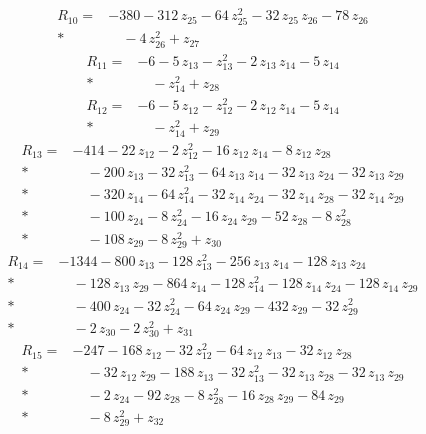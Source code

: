 \documentclass[10pt]{article}
\begin{document}
\begin{align*}
R_{10}={}& - 380 - 312\,z_{25} - 64\,z_{25}^{2} - 32\,z_{25}\,z_{26} - 78\,z_{26} \\*
&\quad - 4\,z_{26}^{2} + z_{27}
\end{align*}
\begin{align*}
R_{11}={}& - 6 - 5\,z_{13} - z_{13}^{2} - 2\,z_{13}\,z_{14} - 5\,z_{14} \\*
&\quad - z_{14}^{2} + z_{28}
\end{align*}
\begin{align*}
R_{12}={}& - 6 - 5\,z_{12} - z_{12}^{2} - 2\,z_{12}\,z_{14} - 5\,z_{14} \\*
&\quad - z_{14}^{2} + z_{29}
\end{align*}
\begin{align*}
R_{13}={}& - 414 - 22\,z_{12} - 2\,z_{12}^{2} - 16\,z_{12}\,z_{14} - 8\,z_{12}\,z_{28} \\*
&\quad - 200\,z_{13} - 32\,z_{13}^{2} - 64\,z_{13}\,z_{14} - 32\,z_{13}\,z_{24} - 32\,z_{13}\,z_{29} \\*
&\quad - 320\,z_{14} - 64\,z_{14}^{2} - 32\,z_{14}\,z_{24} - 32\,z_{14}\,z_{28} - 32\,z_{14}\,z_{29} \\*
&\quad - 100\,z_{24} - 8\,z_{24}^{2} - 16\,z_{24}\,z_{29} - 52\,z_{28} - 8\,z_{28}^{2} \\*
&\quad - 108\,z_{29} - 8\,z_{29}^{2} + z_{30}
\end{align*}
\begin{align*}
R_{14}={}& - 1344 - 800\,z_{13} - 128\,z_{13}^{2} - 256\,z_{13}\,z_{14} - 128\,z_{13}\,z_{24} \\*
&\quad - 128\,z_{13}\,z_{29} - 864\,z_{14} - 128\,z_{14}^{2} - 128\,z_{14}\,z_{24} - 128\,z_{14}\,z_{29} \\*
&\quad - 400\,z_{24} - 32\,z_{24}^{2} - 64\,z_{24}\,z_{29} - 432\,z_{29} - 32\,z_{29}^{2} \\*
&\quad - 2\,z_{30} - 2\,z_{30}^{2} + z_{31}
\end{align*}
\begin{align*}
R_{15}={}& - 247 - 168\,z_{12} - 32\,z_{12}^{2} - 64\,z_{12}\,z_{13} - 32\,z_{12}\,z_{28} \\*
&\quad - 32\,z_{12}\,z_{29} - 188\,z_{13} - 32\,z_{13}^{2} - 32\,z_{13}\,z_{28} - 32\,z_{13}\,z_{29} \\*
&\quad - 2\,z_{24} - 92\,z_{28} - 8\,z_{28}^{2} - 16\,z_{28}\,z_{29} - 84\,z_{29} \\*
&\quad - 8\,z_{29}^{2} + z_{32}
\end{align*}
\end{document}

